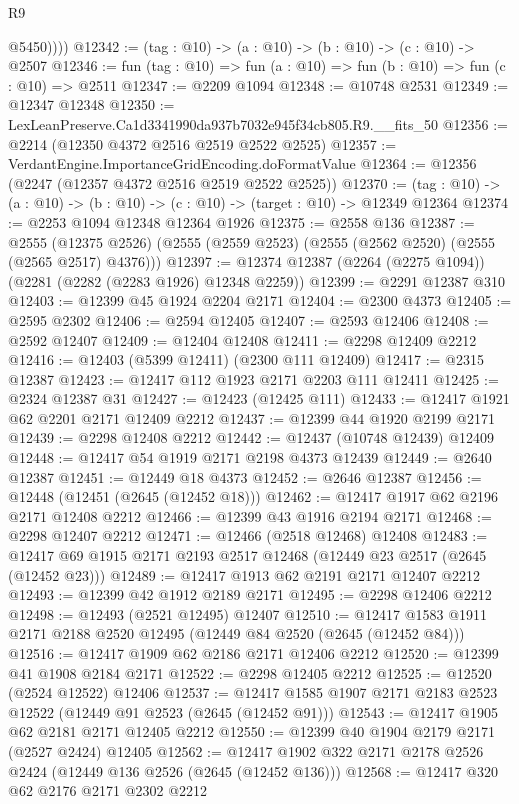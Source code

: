 \begin{lexlean}{R9}
\begin{coremodule}
            @5450))))
@12342 := (tag : @10) -> (a : @10) -> (b : @10) -> (c : @10) -> @2507
@12346 := fun (tag : @10) => fun (a : @10) => fun (b : @10) => fun (c : @10) => @2511
@12347 := @2209 @1094
@12348 := @10748 @2531
@12349 := @12347 @12348
@12350 := LexLeanPreserve.Ca1d3341990da937b7032e945f34cb805.R9.__fits_50
@12356 := @2214 (@12350 @4372 @2516 @2519 @2522 @2525)
@12357 := VerdantEngine.ImportanceGridEncoding.doFormatValue
@12364 := @12356 (@2247 (@12357 @4372 @2516 @2519 @2522 @2525))
@12370 := (tag : @10) -> (a : @10) -> (b : @10) -> (c : @10) -> (target : @10) -> @12349 @12364
@12374 := @2253 @1094 @12348 @12364 @1926
@12375 := @2558 @136
@12387 := @2555
    (@12375 @2526)
    (@2555 (@2559 @2523) (@2555 (@2562 @2520) (@2555 (@2565 @2517) @4376)))
@12397 := @12374 @12387 (@2264 (@2275 @1094)) (@2281 (@2282 (@2283 @1926) @12348 @2259))
@12399 := @2291 @12387 @310
@12403 := @12399 @45 @1924 @2204 @2171
@12404 := @2300 @4373
@12405 := @2595 @2302
@12406 := @2594 @12405
@12407 := @2593 @12406
@12408 := @2592 @12407
@12409 := @12404 @12408
@12411 := @2298 @12409 @2212
@12416 := @12403 (@5399 @12411) (@2300 @111 @12409)
@12417 := @2315 @12387
@12423 := @12417 @112 @1923 @2171 @2203 @111 @12411
@12425 := @2324 @12387 @31
@12427 := @12423 (@12425 @111)
@12433 := @12417 @1921 @62 @2201 @2171 @12409 @2212
@12437 := @12399 @44 @1920 @2199 @2171
@12439 := @2298 @12408 @2212
@12442 := @12437 (@10748 @12439) @12409
@12448 := @12417 @54 @1919 @2171 @2198 @4373 @12439
@12449 := @2640 @12387
@12451 := @12449 @18 @4373
@12452 := @2646 @12387
@12456 := @12448 (@12451 (@2645 (@12452 @18)))
@12462 := @12417 @1917 @62 @2196 @2171 @12408 @2212
@12466 := @12399 @43 @1916 @2194 @2171
@12468 := @2298 @12407 @2212
@12471 := @12466 (@2518 @12468) @12408
@12483 := @12417 @69 @1915 @2171 @2193 @2517 @12468 (@12449 @23 @2517 (@2645 (@12452 @23)))
@12489 := @12417 @1913 @62 @2191 @2171 @12407 @2212
@12493 := @12399 @42 @1912 @2189 @2171
@12495 := @2298 @12406 @2212
@12498 := @12493 (@2521 @12495) @12407
@12510 := @12417 @1583 @1911 @2171 @2188 @2520 @12495 (@12449 @84 @2520 (@2645 (@12452 @84)))
@12516 := @12417 @1909 @62 @2186 @2171 @12406 @2212
@12520 := @12399 @41 @1908 @2184 @2171
@12522 := @2298 @12405 @2212
@12525 := @12520 (@2524 @12522) @12406
@12537 := @12417 @1585 @1907 @2171 @2183 @2523 @12522 (@12449 @91 @2523 (@2645 (@12452 @91)))
@12543 := @12417 @1905 @62 @2181 @2171 @12405 @2212
@12550 := @12399 @40 @1904 @2179 @2171 (@2527 @2424) @12405
@12562 := @12417 @1902 @322 @2171 @2178 @2526 @2424 (@12449 @136 @2526 (@2645 (@12452 @136)))
@12568 := @12417 @320 @62 @2176 @2171 @2302 @2212

\end{coremodule}
\end{lexlean}

